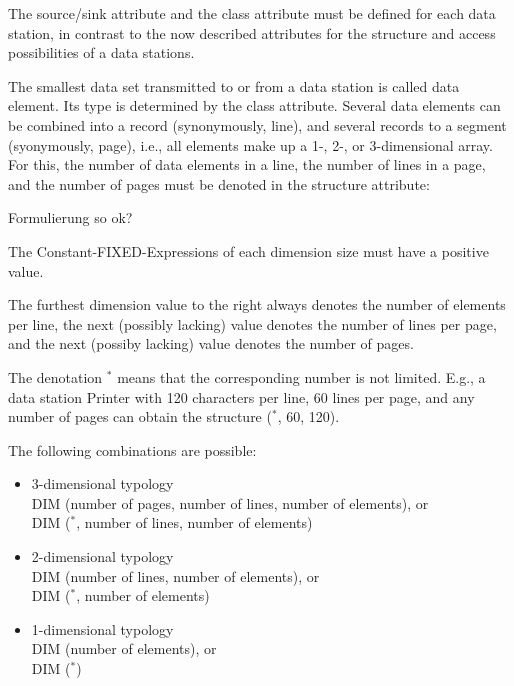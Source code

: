 The source/sink attribute and the class attribute must be defined for
each data station, in contrast to the now described attributes for the
structure and access possibilities of a data stations.

The smallest data set transmitted to or from a data station is called
data element. Its type is determined by the class attribute. Several
data elements can be combined into a record (synonymously, line), and
several records to a segment (syonymously, page), i.e., all elements
make up a 1-, 2-, or 3-dimensional array. For this, the number of data
elements in a line, the number of lines in a page, and the number of
pages must be denoted in the structure attribute:



\begin{discuss}
Formulierung so ok?

The Constant-FIXED-Expressions of each dimension size
 must have a positive value.

The furthest dimension value to the right always denotes the number of
elements per line,
 the next (possibly lacking) value denotes
the number of lines per page, and the next (possiby lacking)
value denotes the number of pages.
\end{discuss}
The denotation $^*$ means that
the corresponding number is not limited. E.g., a data station Printer
with 120 characters per line, 60 lines per page, and any number of pages
can obtain the structure ($^*$, 60, 120).

The following combinations are possible:
\begin{itemize}
\item 3-dimensional typology\\
DIM (number of pages, number of lines, number of elements), or\\
DIM ($^*$, number of lines, number of elements)
\item 2-dimensional typology\\
DIM (number of lines, number of elements), or\\
DIM ($^*$, number of elements)
\item 1-dimensional typology\\
DIM (number of elements), or\\
DIM ($^*$)
\end{itemize}

